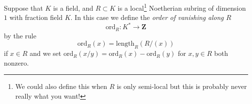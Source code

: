 \begin{definition}
\label{definition-ord}
Suppose that $K$ is a field, and $R \subset K$ is a
local\footnote{We could also define this when $R$ is only
semi-local but this is probably never really what you want!}
Noetherian subring of dimension $1$ with fraction field $K$.
In this case we define the {\it order of vanishing along $R$}
$$
\text{ord}_R : K^* \longrightarrow \mathbf{Z}
$$
by the rule
$$
\text{ord}_R(x) = \text{length}_R(R/(x))
$$
if $x \in R$ and we set
$\text{ord}_R(x/y) = \text{ord}_R(x) - \text{ord}_R(y)$
for $x, y \in R$ both nonzero.
\end{definition}